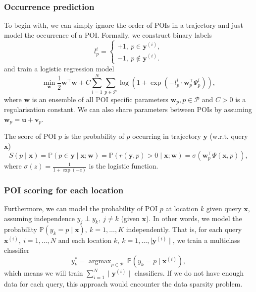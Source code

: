 \documentclass[9pt]{extarticle}
\DeclareMathOperator*{\argmax}{argmax}
\begin{document}
\subsubsection{Occurrence prediction}
\label{sec:logistic}

To begin with, we can simply ignore the order of POIs in a trajectory and just model the occurrence of a POI.
Formally, we construct binary labels
\begin{equation*}
l_p^i = \begin{cases}
+1,~p \in \mathbf{y}^{(i)}, \\
-1,~p \notin \mathbf{y}^{(i)}.
\end{cases}
\end{equation*}
and train a logistic regression model 
\begin{equation*}
\min_{\mathbf{w}} \frac{1}{2} \mathbf{w}^\top \mathbf{w} + 
C \sum_{i=1}^N \sum_{p \in \mathcal{P}} \log \left(1 + \exp \left(- l_p^i \cdot \mathbf{w}_p^\top \Psi_p^i \right) \right), %
\end{equation*}
where $\mathbf{w}$ is an ensemble of all POI specific parameters $\mathbf{w}_p, p \in \mathcal{P}$ and $C>0$ is a regularisation constant.
We can also share parameters between POIs by assuming $\mathbf{w}_p = \mathbf{u} + \mathbf{v}_p$.

The score of POI $p$ is the probability of $p$ occurring in trajectory $\mathbf{y}$ (w.r.t. query $\mathbf{x}$)
\begin{equation*}
S(p \mid \mathbf{x})
= \mathbb{P}(p \in \mathbf{y} \mid \mathbf{x}; \mathbf{w})
= \mathbb{P}(r(\mathbf{y}, p) > 0 \mid \mathbf{x}; \mathbf{w})
= \sigma \left( \mathbf{w}_p^\top \Psi(\mathbf{x}, p) \right),
\end{equation*}
where $\sigma(z) = \frac{1}{1+\exp({-z})}$ is the logistic function.



\subsubsection{POI scoring for each location}
\label{sec:multi}

Furthermore, we can model the probability of POI $p$ at location $k$ given query $\mathbf{x}$, 
assuming independence $y_j \perp y_k,~ j\ne k$ (given $\mathbf{x}$).
In other words, we model the probability $\mathbb{P}(y_k = p \mid \mathbf{x}),~ k=1,\dots,K$ independently.
That is, for each query $\mathbf{x}^{(i)},~ i=1,\dots,N$ and each location $k,~ k=1,\dots,\mid \mathbf{y}^{(i)} \mid$, 
we train a multiclass classifier
\begin{equation*}
y_k^* = \argmax_{p \in \mathcal{P}} ~\mathbb{P}(y_k = p \mid \mathbf{x}^{(i)}),
\end{equation*}
which means we will train $\sum_{i=1}^N \mid \mathbf{y}^{(i)} \mid$ classifiers.
If we do not have enough data for each query, this approach would encounter the data sparsity problem.
\end{document}
